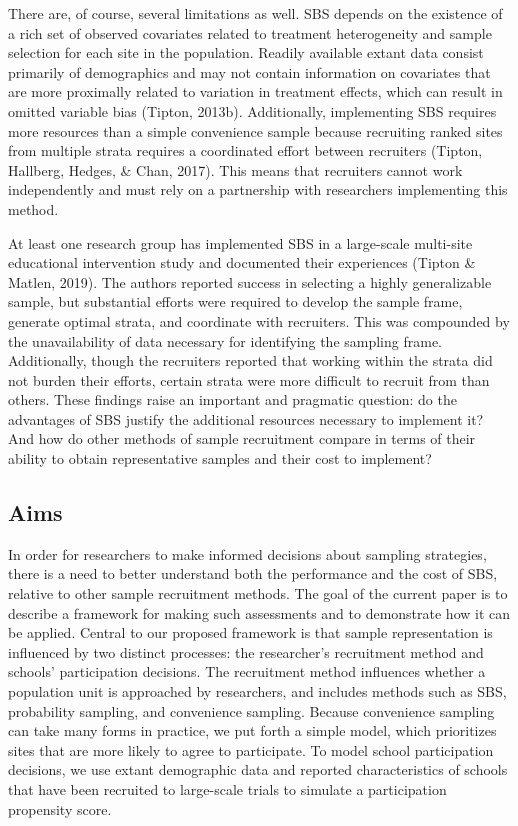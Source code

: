 \documentclass[
  english,
  man,floatsintext]{apa6}
\begin{document}
There are, of course, several limitations as well. SBS depends on the existence of a rich set of observed covariates related to treatment heterogeneity and sample selection for each site in the population. Readily available extant data consist primarily of demographics and may not contain information on covariates that are more proximally related to variation in treatment effects, which can result in omitted variable bias (Tipton, 2013b). Additionally, implementing SBS requires more resources than a simple convenience sample because recruiting ranked sites from multiple strata requires a coordinated effort between recruiters (Tipton, Hallberg, Hedges, \& Chan, 2017). This means that recruiters cannot work independently and must rely on a partnership with researchers implementing this method.

At least one research group has implemented SBS in a large-scale multi-site educational intervention study and documented their experiences (Tipton \& Matlen, 2019). The authors reported success in selecting a highly generalizable sample, but substantial efforts were required to develop the sample frame, generate optimal strata, and coordinate with recruiters.
This was compounded by the unavailability of data necessary for identifying the sampling frame.
Additionally, though the recruiters reported that working within the strata did not burden their efforts, certain strata were more difficult to recruit from than others.
These findings raise an important and pragmatic question: do the advantages of SBS justify the additional resources necessary to implement it?
And how do other methods of sample recruitment compare in terms of their ability to obtain representative samples and their cost to implement?

\hypertarget{aims}{%
\subsection{Aims}\label{aims}}

In order for researchers to make informed decisions about sampling strategies, there is a need to better understand both the performance and the cost of SBS, relative to other sample recruitment methods.
The goal of the current paper is to describe a framework for making such assessments and to demonstrate how it can be applied.
Central to our proposed framework is that sample representation is influenced by two distinct processes: the researcher's recruitment method and schools' participation decisions.
The recruitment method influences whether a population unit is approached by researchers, and includes methods such as SBS, probability sampling, and convenience sampling.
Because convenience sampling can take many forms in practice, we put forth a simple model, which prioritizes sites that are more likely to agree to participate.
To model school participation decisions, we use extant demographic data and reported characteristics of schools that have been recruited to large-scale trials to simulate a participation propensity score.
\end{document}

